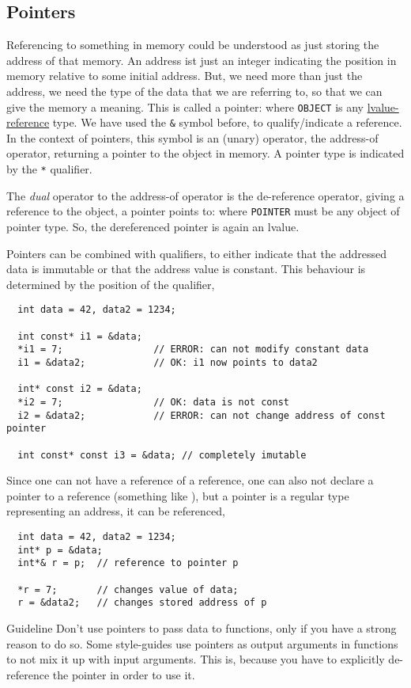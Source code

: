 \subsection{Pointers}
Referencing to something in memory could be understood as just storing the address of that memory. An address ist just an integer indicating
the position in memory relative to some initial address. But, we need more than just the address, we need the type of the data that we are
referring to, so that we can give the memory a meaning. This is called a pointer:
%
%
where \texttt{OBJECT} is any \underline{lvalue-reference} type.
We have used the \texttt{\&} symbol before, to qualify/indicate a reference. In the context of pointers, this symbol is an (unary) operator, the
address-of operator, returning a pointer to the object in memory. A pointer type is indicated by the \texttt{*} qualifier.

The \textit{dual} operator to the address-of operator is the de-reference operator, giving a reference to the object, a pointer points to:
%
%
where \texttt{POINTER} must be any object of pointer type. So, the dereferenced pointer is again an lvalue.

Pointers can be combined with  qualifiers, to either indicate that the addressed data is immutable or that the address value is constant.
This behaviour is determined by the position of the  qualifier, \ie
%
\begin{verbatim}
  int data = 42, data2 = 1234;

  int const* i1 = &data;
  *i1 = 7;                // ERROR: can not modify constant data
  i1 = &data2;            // OK: i1 now points to data2

  int* const i2 = &data;
  *i2 = 7;                // OK: data is not const
  i2 = &data2;            // ERROR: can not change address of const pointer

  int const* const i3 = &data; // completely imutable
\end{verbatim}

Since one can not have a reference of a reference, one can also not declare a pointer to a reference (something like ), but a
pointer is a regular type representing an address, it can be referenced, \ie
%
\begin{verbatim}
  int data = 42, data2 = 1234;
  int* p = &data;
  int*& r = p;  // reference to pointer p

  *r = 7;       // changes value of data;
  r = &data2;   // changes stored address of p
\end{verbatim}

\begin{guideline}{Guideline}
  Don't use pointers to pass data to functions, only if you have a strong reason to do so. Some style-guides use pointers as output arguments
  in functions to not mix it up with input arguments. This is, because you have to explicitly de-reference the pointer in order to use it.
\end{guideline}
